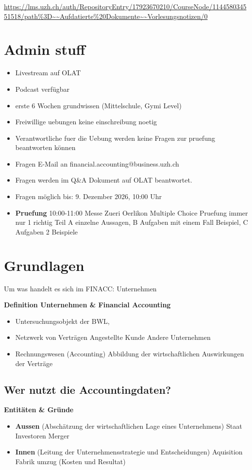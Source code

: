 
\url{https://lms.uzh.ch/auth/RepositoryEntry/17923670210/CourseNode/114458034551518/path%3D~~Aufdatierte%20Dokumente~~Vorlesungsnotizen/0}

\section{Admin stuff}
\begin{itemize}
    \item Livestream auf OLAT
    \item Podcast verfügbar
    \item erste 6 Wochen grundwissen (Mittelschule, Gymi Level)
    \item Freiwillige uebungen keine einschreibung noetig
    \item Verantwortliche fuer die Uebung werden keine Fragen zur pruefung beantworten können
    \item Fragen E-Mail an financial.accounting@business.uzh.ch 
    \item Fragen werden im Q\&A Dokument auf OLAT beantwortet.
    \item Fragen möglich bis: 9. Dezember 2026, 10:00 Uhr 
    \item \textbf{Pruefung}
     10:00-11:00
    \subitem Messe Zueri Oerlikon
    \subitem Multiple Choice Pruefung immer nur 1 richtig
    \subitem Teil A einzelne Aussagen, B Aufgaben mit einem Fall Beispiel, C Aufgaben 2 Beispiele
\end{itemize}

\section{Grundlagen}

Um was handelt es sich im FINACC: Unternehmen

\textbf{Definition Unternehmen \& Financial Accounting}
\begin{itemize}
    \item Untersuchungsobjekt der BWL,
    \item Netzwerk von Verträgen
    \subitem Angestellte
    \subitem Kunde 
    \subitem Andere Unternehmen
    \item Rechnungswesen (Accounting)
    \subitem Abbildung der wirtschaftlichen Auswirkungen der Verträge
\end{itemize}

\subsection{Wer nutzt die Accountingdaten?}
\textbf{Entitäten \& Gründe}
\begin{itemize}
    \item \textbf{Aussen} (Abschätzung der wirtschaftlichen Lage eines Unternehmens)
        \subitem Staat
        \subitem Investoren
        \subitem Merger
    \item \textbf{Innen} (Leitung der Unternehmensstrategie und Entscheidungen)
        \subitem Aquisition
        \subitem Fabrik umzug (Kosten und Resultat)
\end{itemize}

